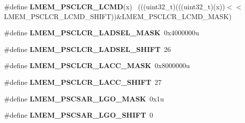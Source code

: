\begin{DoxyCompactItemize}
\item 
\hypertarget{group___l_m_e_m___register___masks_gaef1695fa5f91a46b3c43c38e2647dc68}{}\#define {\bfseries L\+M\+E\+M\+\_\+\+P\+S\+C\+L\+C\+R\+\_\+\+L\+C\+M\+D}(x)                                        ~(((uint32\+\_\+t)(((uint32\+\_\+t)(x))$<$$<$L\+M\+E\+M\+\_\+\+P\+S\+C\+L\+C\+R\+\_\+\+L\+C\+M\+D\+\_\+\+S\+H\+I\+F\+T))\&L\+M\+E\+M\+\_\+\+P\+S\+C\+L\+C\+R\+\_\+\+L\+C\+M\+D\+\_\+\+M\+A\+S\+K)\label{group___l_m_e_m___register___masks_gaef1695fa5f91a46b3c43c38e2647dc68}

\item 
\hypertarget{group___l_m_e_m___register___masks_gabd97683d73f180aca7addb1153ffaf6a}{}\#define {\bfseries L\+M\+E\+M\+\_\+\+P\+S\+C\+L\+C\+R\+\_\+\+L\+A\+D\+S\+E\+L\+\_\+\+M\+A\+S\+K}~0x4000000u\label{group___l_m_e_m___register___masks_gabd97683d73f180aca7addb1153ffaf6a}

\item 
\hypertarget{group___l_m_e_m___register___masks_ga1f99e5aff754460dd4536be8fa60a9c5}{}\#define {\bfseries L\+M\+E\+M\+\_\+\+P\+S\+C\+L\+C\+R\+\_\+\+L\+A\+D\+S\+E\+L\+\_\+\+S\+H\+I\+F\+T}~26\label{group___l_m_e_m___register___masks_ga1f99e5aff754460dd4536be8fa60a9c5}

\item 
\hypertarget{group___l_m_e_m___register___masks_ga29729dd58e3ced48e34c3c3310a023e4}{}\#define {\bfseries L\+M\+E\+M\+\_\+\+P\+S\+C\+L\+C\+R\+\_\+\+L\+A\+C\+C\+\_\+\+M\+A\+S\+K}~0x8000000u\label{group___l_m_e_m___register___masks_ga29729dd58e3ced48e34c3c3310a023e4}

\item 
\hypertarget{group___l_m_e_m___register___masks_gabfb6f0e8c562005ed03d40369f72e5d8}{}\#define {\bfseries L\+M\+E\+M\+\_\+\+P\+S\+C\+L\+C\+R\+\_\+\+L\+A\+C\+C\+\_\+\+S\+H\+I\+F\+T}~27\label{group___l_m_e_m___register___masks_gabfb6f0e8c562005ed03d40369f72e5d8}

\item 
\hypertarget{group___l_m_e_m___register___masks_ga756384e983078519389d7bb1e6fb2362}{}\#define {\bfseries L\+M\+E\+M\+\_\+\+P\+S\+C\+S\+A\+R\+\_\+\+L\+G\+O\+\_\+\+M\+A\+S\+K}~0x1u\label{group___l_m_e_m___register___masks_ga756384e983078519389d7bb1e6fb2362}

\item 
\hypertarget{group___l_m_e_m___register___masks_gaf1cb24947c570da38a7c059a65a94cd1}{}\#define {\bfseries L\+M\+E\+M\+\_\+\+P\+S\+C\+S\+A\+R\+\_\+\+L\+G\+O\+\_\+\+S\+H\+I\+F\+T}~0\label{group___l_m_e_m___register___masks_gaf1cb24947c570da38a7c059a65a94cd1}


\end{DoxyCompactItemize}
